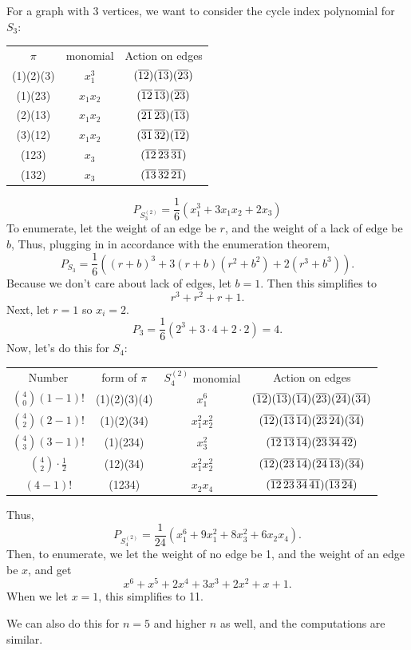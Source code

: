 For a graph with 3 vertices, we want to consider the cycle index polynomial 
for $S_3$: 
\begin{center}
    \begin{tabular}{|c|c|c|}
        \hline 
        $\pi$ & monomial & Action on edges \\ 
        (1)(2)(3) & $x_1^3$ & $(\overline{12})(\overline{13})(\overline{23})$ \\
        (1)(23) & $x_1x_2$ & $(\overline{12} \, \overline{13})(\overline{23})$ \\
        (2)(13) & $x_1x_2$ & $(\overline{21} \, \overline{23})(\overline{13})$ \\
        (3)(12) & $x_1x_2$ & $(\overline{31} \, \overline{32})(\overline{12})$ \\
        (123) & $x_3$ & $(\overline{12} \, \overline{23} \, \overline{31})$ \\ 
        (132) & $x_3$ & $(\overline{13} \, \overline{32} \, \overline{21})$ \\ \hline
    \end{tabular}
\end{center}
\[ P_{S_3^{(2)}} = \frac 16 (x_1^3 + 3x_1x_2 + 2x_3)\]
To enumerate, let the weight of an edge be $r$, and the weight of a lack of
edge be $b$, Thus, plugging in in accordance with the enumeration theorem,
\[
    P_{S_3} = \frac 16 ((r+b)^3 + 3(r+b)(r^2+b^2) + 2(r^3 + b^3)). 
\]
Because we don't care about lack of edges, let $b = 1$. Then this simplifies to 
\[ r^3 + r^2 + r + 1.\]
Next, let $r = 1$ so $x_i = 2$.
\[ P_3 = \frac 16 (2^3 + 3 \cdot 4 + 2 \cdot 2) = 4. \]
Now, let's do this for $S_4$: 
\begin{center}
    \begin{tabular}{|c|c|c|c|}
        \hline
        Number & form of $\pi$ & $S_4^{(2)}$ monomial & Action on edges \\ 
        $\binom 4 0 (1-1)!$ & (1)(2)(3)(4) & $x_1^6$ & $(\overline{12})(\overline{13})(\overline{14})(\overline{23})(\overline{24})(\overline{34})$ \\
        $\binom 4 2 (2-1)!$ & (1)(2)(34) & $x_1^2 x_2^2$ & $(\overline{12})(\overline{13}\,\overline{14})(\overline{23}\,\overline{24})(\overline{34})$ \\
        $\binom 4 3 (3-1)!$ & (1)(234) & $x_3^2$ & $(\overline{12}\,\overline{13}\,\overline{14})(\overline{23}\,\overline{34}\,\overline{42})$ \\
        $\binom 4 2 \cdot \frac 12$ & (12)(34) & $x_1^2 x_2^2$ & $(\overline{12})(\overline{23}\,\overline{14})(\overline{24}\,\overline{13})(\overline{34})$ \\
        $(4-1)!$ & (1234) & $x_2x_4$ & $(\overline{12}\,\overline{23}\,\overline{34}\,\overline{41})(\overline{13}\,\overline{24})$ \\
        \hline 
    \end{tabular}
\end{center}
Thus, 
\[ P_{S_4^{(2)}} = \frac 1{24} (x_1^6 + 9 x_1^2 + 8x_3^2 + 6 x_2 x_4). \]
Then, to enumerate, we let the weight of no edge be 1, and the weight of an edge be $x$, and get 
\[ x^6 + x^5 + 2x^4 + 3x^3 + 2x^2 + x + 1. \]
When we let $x = 1$, this simplifies to 11. 

We can also do this for $n = 5$ and higher $n$ as well, and the computations are similar. 